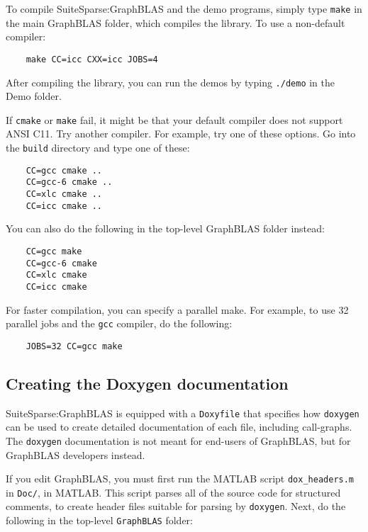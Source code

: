 \documentclass[12pt]{article}
\begin{document}
To compile SuiteSparse:GraphBLAS and the demo programs, simply type \verb'make'
in the main GraphBLAS folder, which compiles the library.  To use a
non-default compiler:

    {\small
    \begin{verbatim}
    make CC=icc CXX=icc JOBS=4 \end{verbatim} }

After compiling the library, you can run the demos by typing \verb'./demo'
in the Demo folder.

If \verb'cmake' or \verb'make' fail, it might be that your default compiler
does not support ANSI C11.  Try another compiler.  For example, try one of
these options.  Go into the \verb'build' directory and type one of these:

    {\small
    \begin{verbatim}
    CC=gcc cmake ..
    CC=gcc-6 cmake ..
    CC=xlc cmake ..
    CC=icc cmake ..  \end{verbatim} }

You can also do the following in the top-level GraphBLAS folder instead:

    {\small
    \begin{verbatim}
    CC=gcc make
    CC=gcc-6 cmake
    CC=xlc cmake
    CC=icc cmake \end{verbatim} }

For faster compilation, you can specify a parallel make.  For example,
to use 32 parallel jobs and the \verb'gcc' compiler, do the following:

    {\small
    \begin{verbatim}
    JOBS=32 CC=gcc make \end{verbatim} }

\subsection{Creating the Doxygen documentation}
\label{sec:doxygen}

SuiteSparse:GraphBLAS is equipped with a \verb'Doxyfile' that specifies how
\verb'doxygen' can be used to create detailed documentation of each file,
including call-graphs.  The \verb'doxygen' documentation is not meant for
end-users of GraphBLAS, but for GraphBLAS developers instead.

If you edit GraphBLAS, you must first run the MATLAB script
\verb'dox_headers.m' in \verb'Doc/', in MATLAB.  This script parses all of the
source code for structured comments, to create header files suitable for
parsing by \verb'doxygen'.  Next, do the following in the top-level
\verb'GraphBLAS' folder:
\end{document}

